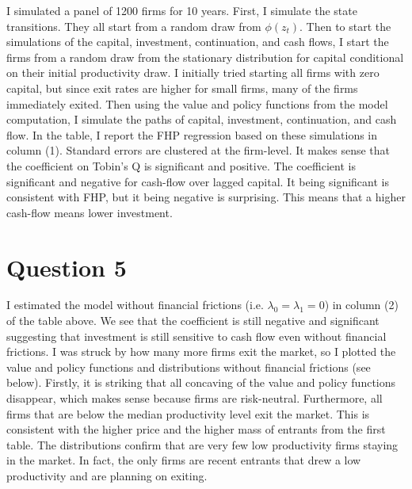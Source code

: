 \documentclass{article}
\begin{document}
I simulated a panel of 1200 firms for 10 years. First, I simulate the state transitions.  They all start from a random draw from $\phi(z_t)$.  Then to start the simulations of the capital, investment, continuation, and cash flows, I start the firms from a random draw from the stationary distribution for capital conditional on their initial productivity draw.  I initially tried starting all firms with zero capital, but since exit rates are higher for small firms, many of the firms immediately exited.  Then using the value and policy functions from the model computation, I simulate the paths of capital, investment, continuation, and cash flow.  In the table, I report the FHP regression based on these simulations in column (1). Standard errors are clustered at the firm-level. It makes sense that the coefficient on Tobin's Q is significant and positive.  The coefficient is significant and negative for cash-flow over lagged capital. It being significant is consistent with FHP, but it being negative is surprising.  This means that a higher cash-flow means lower investment.

\begin{table}[h]

\end{table}

\pagebreak

\section*{Question 5}

I estimated the model without financial frictions (i.e. $\lambda_0 = \lambda_1 = 0$) in column (2) of the table above.  We see that the coefficient is still negative and significant suggesting that investment is still sensitive to cash flow even without financial frictions.  I was struck by how many more firms exit the market, so I plotted the value and policy functions and distributions without financial frictions (see below).  Firstly, it is striking that all concaving of the value and policy functions disappear, which makes sense because firms are risk-neutral.  Furthermore, all firms that are below the median productivity level exit the market.  This is consistent with the higher price and the higher mass of entrants from the first table.  The distributions confirm that are very few low productivity firms staying in the market.  In fact, the only firms are recent entrants that drew a low productivity and are planning on exiting.
\end{document}
